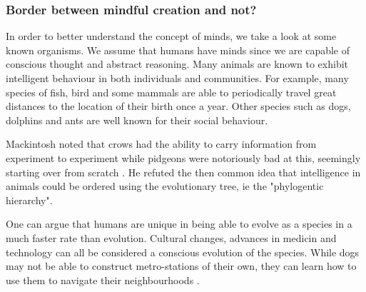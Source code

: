 \documentclass[11pt]{article}
\newenvironment{draft}{\color{dark-cornflower-blue-2}}{\ignorespacesafterend}
\begin{document}
\subsubsection*{Border between mindful creation and not?}


\begin{draft}

In order to better understand the concept of minds, we take a look at some known organisms. We assume that humans have minds since we are capable of conscious thought and abstract reasoning. Many animals are known to exhibit intelligent behaviour in both individuals and communities. For example, many species of fish, bird and some mammals are able to periodically travel great distances to the location of their birth once a year. Other species such as dogs, dolphins and ants are well known for their social behaviour.

Mackintosh noted that crows had the ability to carry information from experiment to experiment while pidgeons were notoriously bad at this, seemingly starting over from scratch \cite{mackintosh1988animals}. He refuted the then common idea that intelligence in animals could be ordered using the evolutionary tree, ie the "phylogentic hierarchy".

One can argue that humans are unique in being able to evolve as a species in a much faster rate than evolution. Cultural changes, advances in medicin and technology can all be considered a conscious evolution of the species. While dogs may not be able to construct metro-stations of their own, they can learn how to use them to navigate their neighbourhoods \cite{moskowDogs}.





\end{draft}
\end{document}
